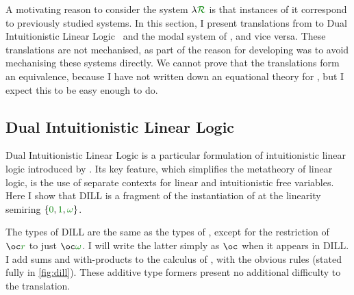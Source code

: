 \newcommand\instDILL{\gr{01\omega}}
\newcommand\instPD{\gr{01\Box}}

\newcommand\unused{\gr0}
\newcommand\true{\gr1}
\newcommand\valid{\gr\Box}

A motivating reason to consider the system $\name$ is that
instances of it correspond to previously studied systems.
In this section, I present translations from \name{} to Dual Intuitionistic
Linear Logic~\citep{Barber1996} and the modal system of \citet{judgmental},
and vice versa.
These translations are not mechanised, as part of the reason for developing
\name{} was to avoid mechanising these systems directly.
We cannot prove that the translations form an equivalence, because I have not
written down an equational theory for \name{}, but I expect this to be easy
enough to do.

\subsection{Dual Intuitionistic Linear Logic}\label{sec:dill}

Dual Intuitionistic Linear Logic is a particular formulation of intuitionistic
linear logic introduced by \citet{Barber1996}.
Its key feature, which simplifies the metatheory of linear logic, is the use of
separate contexts for linear and intuitionistic free variables.
Here I show that DILL is a fragment of the instantiation of \name{} at the
linearity semiring $\{\gr0, \gr1, \gr\omega\}$.

The types of DILL are the same as the types of \name, except for the
restriction of $\oc\gr{r}$ to just $\oc\gr\omega$.
I will write the latter simply as $\oc$ when it appears in DILL\@.
I add sums and with-products to the calculus of \cite{Barber1996}, with the
obvious rules (stated fully in \cref{fig:dill}).
These additive type formers present no additional difficulty to the translation.

